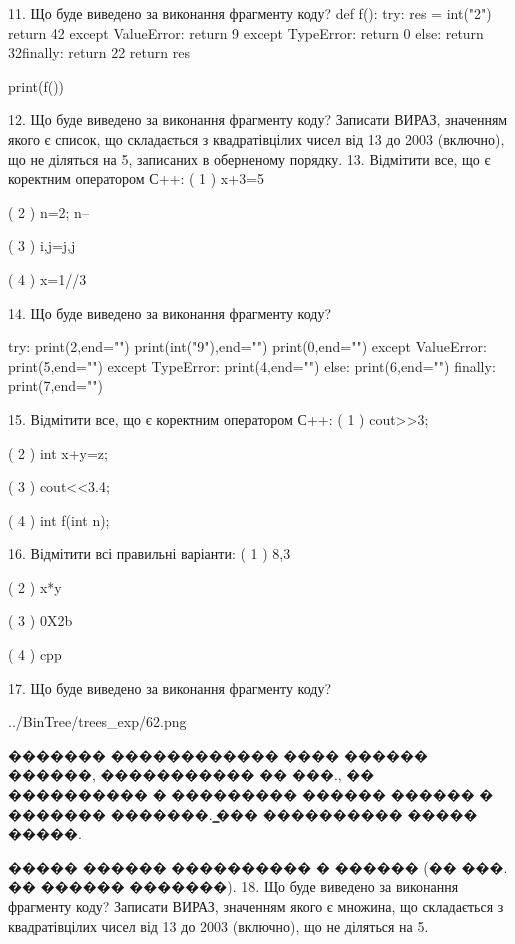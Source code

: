 \documentclass[11pt]{article}
\begin{document}
11. Що буде виведено за виконання фрагменту коду?
def f():
    try:
        res = int("2")
return 42    except ValueError: return 9
    except TypeError: return 0
else: return 32finally: return 22    return res

print(f())

12. Що буде виведено за виконання фрагменту коду?
Записати ВИРАЗ, значенням якого є список, що складається з квадратівцілих чисел від 13 до 2003 (включно), що не діляться на 5, записаних в оберненому порядку.
13. Відмітити все, що є коректним оператором С++:
( 1 ) x+3=5

( 2 ) n=2; n--

( 3 ) i,j=j,j

( 4 ) x=1//3

14. Що буде виведено за виконання фрагменту коду?

try:
    print(2,end="")
    print(int("9"),end="")
    print(0,end="")
except ValueError: print(5,end="")
except TypeError: print(4,end="")
else: print(6,end="")
finally: print(7,end="")


15. Відмітити все, що є коректним оператором С++:
( 1 ) cout>>3;

( 2 ) int x+y=z;

( 3 ) cout<<3.4;

( 4 ) int f(int n);

16. Відмітити всі правильні варіанти:
( 1 ) 8,3

( 2 ) x*y

( 3 ) 0X2b

( 4 ) cpp

17. Що буде виведено за виконання фрагменту коду?

\begin{center}
	{../BinTree/trees_exp/62.png}
\end{center}
������� ������������ ���� ������ ������, ����������� �� ���., �� ���������� � ��������� ������ ������ � ������� �������. ̳��� ���������� ����� �����.\par ����� ������ ���������� � ������ (�� ���. �� ������ �������).
18. Що буде виведено за виконання фрагменту коду?
Записати ВИРАЗ, значенням якого є множина, що складається з квадратівцілих чисел від 13 до 2003 (включно), що не діляться на 5.
\end{document}
